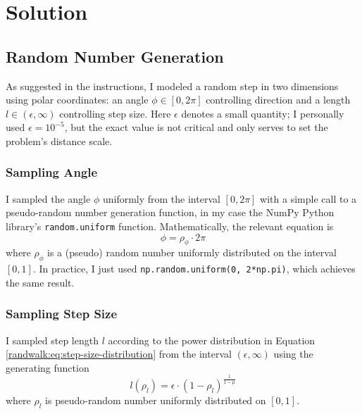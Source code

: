 \documentclass[11pt, a4paper]{article}
\begin{document}
\section{Solution} \label{randwalk:s:solution}

\subsection{Random Number Generation}
As suggested in the instructions, I modeled a random step in two dimensions using polar coordinates: an angle $ \phi \in [0, 2\pi] $ controlling direction and a length $ l \in (\epsilon, \infty) $ controlling step size. Here $ \epsilon $ denotes a small quantity; I personally used $ \epsilon = 10^{-5} $, but the exact value is not critical and only serves to set the problem's distance scale.

\subsubsection{Sampling Angle}
I sampled the angle $ \phi $ uniformly from the interval $ [0, 2\pi] $ with a simple call to a pseudo-random number generation function, in my case the NumPy Python library's \texttt{random.uniform} function. Mathematically, the relevant equation is
\begin{equation}
	\phi = \rho_{\phi} \cdot 2 \pi \label{randwalk:eq:phi-generation}
\end{equation}
where $ \rho_{\phi} $ is a (pseudo) random number uniformly distributed on the interval $ [0, 1] $. In practice, I just used \texttt{np.random.uniform(0, 2*np.pi)}, which achieves the same result.

\subsubsection{Sampling Step Size}
I sampled step length $ l $ according to the power distribution in Equation \ref{randwalk:eq:step-size-distribution} from the interval $ (\epsilon, \infty) $ using the generating function
\begin{equation*}
	l(\rho_{l}) = \epsilon \cdot (1 - \rho_{l})^{\frac{1}{1-\mu}}
\end{equation*}
where $ \rho_{l} $ is pseudo-random number uniformly distributed on $ [0, 1] $. 
\end{document}
